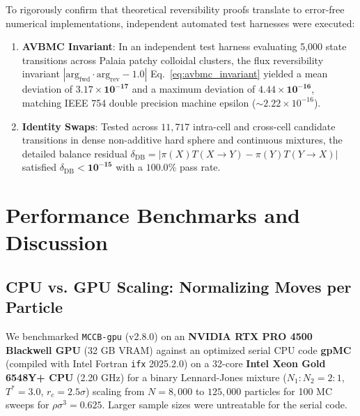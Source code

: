 \documentclass[final,5p,times,twocolumn]{elsarticle}
\begin{document}
To rigorously confirm that theoretical reversibility proofs translate
to error-free numerical implementations, independent automated test
harnesses were executed: 
\begin{enumerate}
    \item \textbf{AVBMC Invariant}: In an independent test harness
      evaluating 5,000 state transitions across Palaia patchy
      colloidal clusters, the flux reversibility invariant
      $|\text{arg}_{\text{fwd}} \cdot \text{arg}_{\text{rev}} - 1.0|$
      Eq.~\eqref{eq:avbmc_invariant} yielded a mean deviation of
      $\mathbf{3.17 \times 10^{-17}}$ and a maximum deviation of
      $\mathbf{4.44 \times 10^{-16}}$, matching IEEE 754 double
      precision machine epsilon ($\sim 2.22 \times 10^{-16}$). 
    \item \textbf{Identity Swaps}: Tested across $11{,}717$ intra-cell
      and cross-cell candidate transitions in dense non-additive hard
      sphere and continuous mixtures, the detailed balance residual
      $\delta_{\text{DB}} = |\pi(X)T(X\to Y) - \pi(Y)T(Y\to X)|$
      satisfied $\delta_{\text{DB}} < \mathbf{10^{-15}}$ with a
      $100.0\%$ pass rate. 
\end{enumerate}

\section{Performance Benchmarks and Discussion}
\label{sec:benchmarks}

\subsection{CPU vs. GPU Scaling: Normalizing Moves per Particle}
\label{sec:bench_cpu_gpu}

We benchmarked \texttt{MCCB-gpu} (v2.8.0) on an \textbf{NVIDIA RTX PRO
  4500 Blackwell GPU} (32 GB VRAM) against an optimized serial CPU
code \textbf{gpMC}~\cite{gpmc2026} (compiled with Intel Fortran
\texttt{ifx} 2025.2.0) on a 32-core \textbf{Intel Xeon Gold 6548Y+
  CPU} (2.20 GHz) for a binary Lennard-Jones mixture ($N_1{:}N_2 = 2{:}1$,
$T^* = 3.0$, $r_c = 2.5\sigma$) scaling from $N = 8{,}000$ to
$125{,}000$ particles for 100 MC sweeps for $\rho\sigma^3=0.625$. Larger sample sizes were
untreatable for the serial code.  
\end{document}
